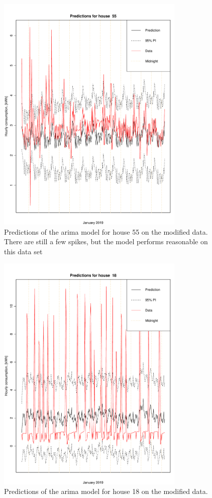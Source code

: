 \begin{figure}
    \centering
    \includegraphics[width=0.8\textwidth]{../../../figures/arimax/arima2_pred_55.pdf}
    \caption{Predictions of the arima model for house 55 on the modified data. There are still a few spikes, but the model performs reasonable on this data set}
    \label{fig:arima1_pred_55}
\end{figure}

\begin{figure}
    \centering
    \includegraphics[width=0.8\textwidth]{../../../figures/arimax/arima2_pred_18.pdf}
    \caption{Predictions of the arima model for house 18 on the modified data.}
    \label{fig:arima1_pred_18}
\end{figure}


